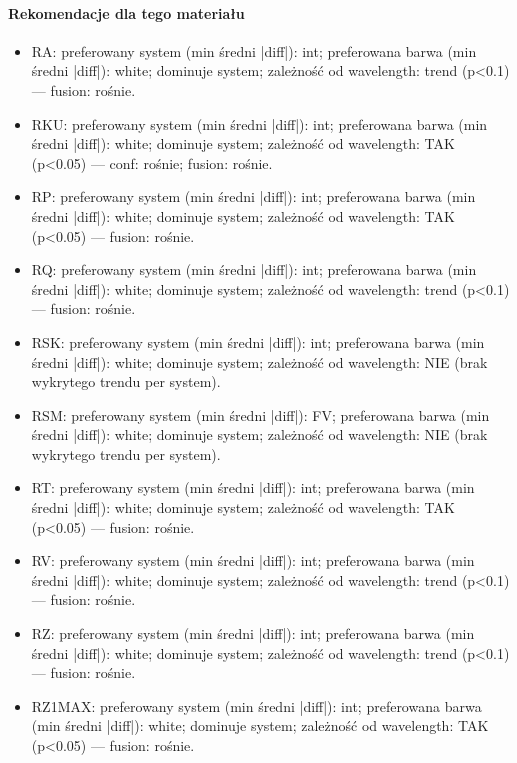 \documentclass[
  10pt,
]{article}
\begin{document}
\paragraph{Rekomendacje dla tego materiału}
\begin{itemize}
\item RA: preferowany system (min średni |diff|): int; preferowana barwa (min średni |diff|): white; dominuje system; zależność od wavelength: trend (p<0.1) — fusion: rośnie.
\item RKU: preferowany system (min średni |diff|): int; preferowana barwa (min średni |diff|): white; dominuje system; zależność od wavelength: TAK (p<0.05) — conf: rośnie; fusion: rośnie.
\item RP: preferowany system (min średni |diff|): int; preferowana barwa (min średni |diff|): white; dominuje system; zależność od wavelength: TAK (p<0.05) — fusion: rośnie.
\item RQ: preferowany system (min średni |diff|): int; preferowana barwa (min średni |diff|): white; dominuje system; zależność od wavelength: trend (p<0.1) — fusion: rośnie.
\item RSK: preferowany system (min średni |diff|): int; preferowana barwa (min średni |diff|): white; dominuje system; zależność od wavelength: NIE (brak wykrytego trendu per system).
\item RSM: preferowany system (min średni |diff|): FV; preferowana barwa (min średni |diff|): white; dominuje system; zależność od wavelength: NIE (brak wykrytego trendu per system).
\item RT: preferowany system (min średni |diff|): int; preferowana barwa (min średni |diff|): white; dominuje system; zależność od wavelength: TAK (p<0.05) — fusion: rośnie.
\item RV: preferowany system (min średni |diff|): int; preferowana barwa (min średni |diff|): white; dominuje system; zależność od wavelength: trend (p<0.1) — fusion: rośnie.
\item RZ: preferowany system (min średni |diff|): int; preferowana barwa (min średni |diff|): white; dominuje system; zależność od wavelength: trend (p<0.1) — fusion: rośnie.
\item RZ1MAX: preferowany system (min średni |diff|): int; preferowana barwa (min średni |diff|): white; dominuje system; zależność od wavelength: TAK (p<0.05) — fusion: rośnie.
\end{itemize}
\end{document}
